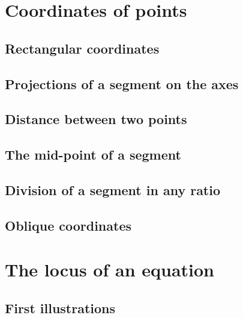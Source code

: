 \documentclass{book}
\begin{document}
\contentsmargin{0pt}%
\tableofcontents

\chapter{Coordinates of points}
	\section{Rectangular coordinates} \lipsum[1]
	\section{Projections of a segment on the axes} \lipsum[2]
	\section{Distance between two points} \lipsum[3]
	\section{The mid-point of a segment} \lipsum[4]
	\section{Division of a segment in any ratio} \lipsum[5]
	\section{Oblique coordinates} \lipsum[6]

\chapter{The locus of an equation}
	\section{First illustrations} \lipsum[1]
\end{document}
